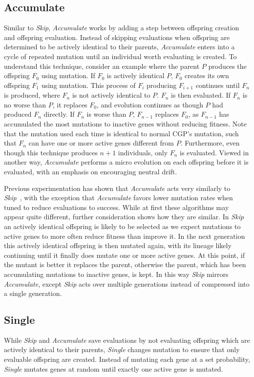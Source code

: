 \documentclass[journal]{IEEEtran}
\begin{document}
\subsection{Accumulate}
Similar to \emph{Skip}, \emph{Accumulate} works by adding a step between offspring
creation and offspring evaluation.  Instead of skipping evaluations when offspring
are determined to be actively identical to their parents, \emph{Accumulate} enters
into a cycle of repeated mutation until an individual worth evaluating is created.
To understand this technique, consider an example where the parent $P$ produces
the offspring $F_0$ using mutation. If $F_0$ is actively identical $P$, $F_0$
creates its own offspring $F_1$ using mutation.  This process of $F_i$ producing
$F_{i+1}$ continues until $F_n$ is produced, where $F_n$ is not actively identical
to $P$.  $F_n$ is then evaluated.  If $F_n$ is no worse than $P$, it replaces
$F_0$, and evolution continues as though $P$ had produced $F_n$ directly.  If
$F_n$ is worse than $P$, $F_{n-1}$ replaces $F_0$, as $F_{n-1}$ has accumulated
the most mutations to inactive genes without reducing fitness.  Note that
the mutation used each time is identical to normal CGP's mutation, such that
$F_n$ can have one or more active genes different from $P$.  Furthermore, even
though this technique produces $n+1$ individuals, only $F_n$ is evaluated.
Viewed in another way, \emph{Accumulate} performs a micro evolution on each offspring
before it is evaluated, with an emphasis on encouraging neutral drift.

Previous experimentation has shown that \emph{Accumulate} acts very similarly to
\emph{Skip}~\cite{goldman:2013:cgpwaste}, with the exception that \emph{Accumulate}
favors lower mutation rates when tuned to reduce evaluations to success. While at first these algorithms may appear
quite different, further consideration shows how they are similar.  In \emph{Skip}
an actively identical offspring is likely to be selected as we expect mutations to
active genes to more often reduce fitness than improve it.  In the next generation
this actively identical offspring is then mutated again, with its lineage likely
continuing until it finally does mutate one or more active genes.  At this point, if the
mutant is better it replaces the parent, otherwise the parent, which has been accumulating
mutations to inactive genes, is kept.  In this way \emph{Skip} mirrors \emph{Accumulate},
except \emph{Skip} acts over multiple generations instead of compressed into a single generation.

\subsection{Single}
While \emph{Skip} and \emph{Accumulate} save evaluations by not evaluating offspring
which are actively identical to their parents, \emph{Single} changes
mutation to ensure that only evaluable offspring are created.  Instead
of mutating each gene at a set probability, \emph{Single} mutates genes at
random until exactly one active gene is mutated.
\end{document}
